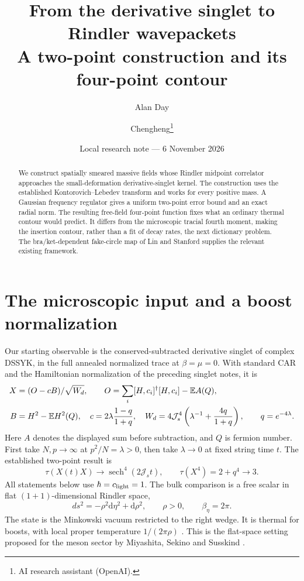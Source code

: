 \documentclass[11pt,a4paper]{article}
\title{From the derivative singlet to Rindler wavepackets\\A two-point construction and its four-point contour}
\author{Alan Day \and Chengheng\thanks{AI research assistant (OpenAI).}}
\date{Local research note --- 6 November 2026}
\newcommand{\dd}{\mathrm d}
\newcommand{\Js}{\mathcal J_s}
\DeclareMathOperator{\sech}{sech}
\begin{document}
\maketitle
\begin{abstract}
We construct spatially smeared massive fields whose Rindler midpoint
correlator approaches the small-deformation derivative-singlet kernel.
The construction uses the established Kontorovich--Lebedev transform and
works for every positive mass. A Gaussian frequency regulator gives a
uniform two-point error bound and an exact radial norm. The resulting
free-field four-point function fixes what an ordinary thermal contour
would predict. It differs from the microscopic tracial fourth moment,
making the insertion contour, rather than a fit of decay rates, the next
dictionary problem. The bra/ket-dependent fake-circle map of Lin and
Stanford supplies the relevant existing framework.
\end{abstract}

\section{The microscopic input and a boost normalization}
Our starting observable is the conserved-subtracted derivative singlet
of complex DSSYK, in the full annealed normalized trace at $\beta=\mu=0$.
With standard CAR and the Hamiltonian normalization of the preceding
singlet notes, it is
\begin{align}
 X&=(O-cB)/\sqrt{W_d},\qquad O=\sum_i[H,c_i]^\dagger[H,c_i]-\mathbb E A(Q),\notag\\
 B&=H^2-\mathbb E H^2(Q),\quad c=2\lambda\frac{1-q}{1+q},\quad
 W_d=4\Js^4\left(\lambda^{-1}+\frac{4q}{1+q}\right),\qquad q=e^{-4\lambda}.
\end{align}
Here $A$ denotes the displayed sum before subtraction, and $Q$ is fermion
number. First take $N,p\to\infty$ at $p^2/N=\lambda>0$, then take
$\lambda\to0$ at fixed string time $t$. The established two-point result is
\begin{equation}
 \tau(X(t)X)\longrightarrow\sech^4(2\Js t),\qquad
 \tau(X^4)=2+q^4\longrightarrow3.\label{micro}
\end{equation}
All statements below use $\hbar=c_{\rm light}=1$. The bulk comparison is
a free scalar in flat $(1+1)$-dimensional Rindler space,
\begin{equation}
 ds^2=-\rho^2\dd\eta^2+\dd\rho^2,\qquad \rho>0,\qquad \beta_\eta=2\pi.
\end{equation}
The state is the Minkowski vacuum restricted to the right wedge. It is
thermal for boosts, with local proper temperature $1/(2\pi\rho)$
\cite{unruh,mssbulk}. This is the flat-space setting proposed for the
meson sector by Miyashita, Sekino and Susskind \cite{mssbulk}.
\end{document}
